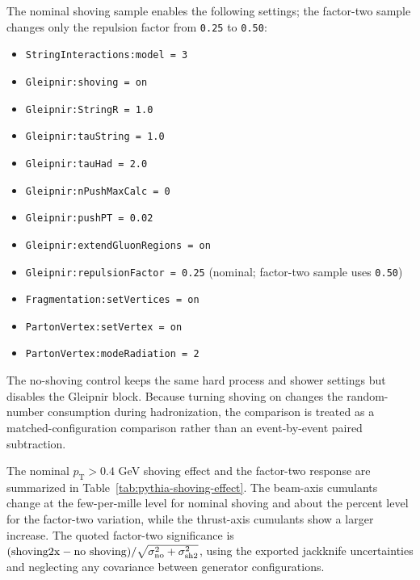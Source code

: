 \documentclass{article}
\newcommand{\pT}{\ensuremath{p_{\mathrm{T}}}}
\begin{document}
The nominal shoving sample enables the following settings; the factor-two sample
changes only the repulsion factor from \texttt{0.25} to \texttt{0.50}:
\begin{itemize}
\setlength\itemsep{0pt}
\item \texttt{StringInteractions:model = 3}
\item \texttt{Gleipnir:shoving = on}
\item \texttt{Gleipnir:StringR = 1.0}
\item \texttt{Gleipnir:tauString = 1.0}
\item \texttt{Gleipnir:tauHad = 2.0}
\item \texttt{Gleipnir:nPushMaxCalc = 0}
\item \texttt{Gleipnir:pushPT = 0.02}
\item \texttt{Gleipnir:extendGluonRegions = on}
\item \texttt{Gleipnir:repulsionFactor = 0.25} (nominal; factor-two sample uses \texttt{0.50})
\item \texttt{Fragmentation:setVertices = on}
\item \texttt{PartonVertex:setVertex = on}
\item \texttt{PartonVertex:modeRadiation = 2}
\end{itemize}
The no-shoving control keeps the same hard process and shower settings but
disables the Gleipnir block. Because turning shoving on changes the random-number
consumption during hadronization, the comparison is treated as a
matched-configuration comparison rather than an event-by-event paired
subtraction.

The nominal \(\pT>0.4\) GeV shoving effect and the factor-two response are
summarized in Table~\ref{tab:pythia-shoving-effect}. The beam-axis cumulants
change at the few-per-mille level for nominal shoving and about the percent level
for the factor-two variation, while the thrust-axis cumulants show a larger
increase. The quoted factor-two significance is \((\mathrm{shoving2x}-
\mathrm{no\ shoving})/\sqrt{\sigma_{\rm no}^2+\sigma_{\rm sh2}^2}\), using the
exported jackknife uncertainties and neglecting any covariance between generator
configurations.
\end{document}
